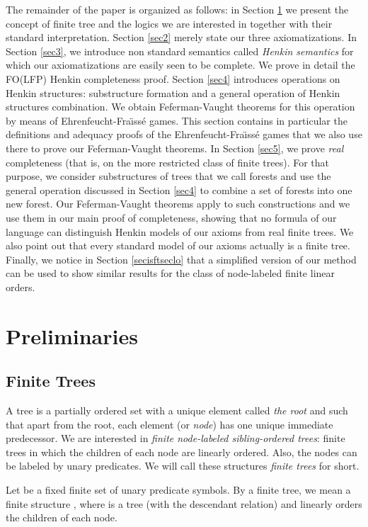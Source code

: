 \documentclass{LMCS}
\newcommand{\folfp}{\textsf{FO(LFP)}\xspace}
\begin{document}
The remainder of the paper is organized as follows: in Section \ref{sec1} we present the concept of finite tree and the logics we are interested in together with their standard interpretation. 
Section \ref{sec2} merely state our three
axiomatizations. In Section \ref{sec3}, we introduce non standard semantics called \textit{Henkin
semantics} for which our axiomatizations are easily seen to be
complete. We prove in detail the \folfp Henkin completeness proof. Section \ref{sec4} introduces operations on Henkin structures: substructure formation and a general operation of Henkin structures combination. We obtain Feferman-Vaught theorems for this operation by means of Ehrenfeucht-Fra\"{\i}ss\'e games. This section contains in particular the definitions and adequacy proofs of the Ehrenfeucht-Fra\"{\i}ss\'e games that we also use there to prove our Feferman-Vaught theorems.
In Section \ref{sec5}, we prove \textit{real} completeness (that is, on
the more restricted class of finite trees).
For that purpose, we consider substructures of trees
that we call forests and use the general operation discussed in Section \ref{sec4}
to combine a set of forests into one new forest. Our Feferman-Vaught theorems apply to such
constructions and we use them in our main proof of completeness, showing
that no formula of our language can distinguish Henkin models of
our axioms from real finite trees.
We also point out that every standard model of our axioms actually is a finite tree. 
Finally, we notice in Section \ref{secisftseclo} that a simplified version of our method can be used to show similar results for the class of node-labeled finite linear orders.

\section{Preliminaries}
\label{sec1}





\subsection{Finite Trees}


A tree is a partially ordered set with a unique element called \emph{the root} and such that apart from the root, each element (or \emph{node}) has one unique immediate predecessor. We are interested in
\emph{finite node-labeled sibling-ordered trees}: finite trees in which the
children of each node are linearly ordered. Also, the nodes can be
labeled by unary predicates. We will call these structures
\emph{finite trees} for short.
\begin{defi}
  Let  be a fixed finite set of unary predicate symbols.  By a finite tree, we mean a finite structure
  , where  is a tree (with
   the descendant relation) and  linearly orders the
  children of each node.
\end{defi}
\end{document}

